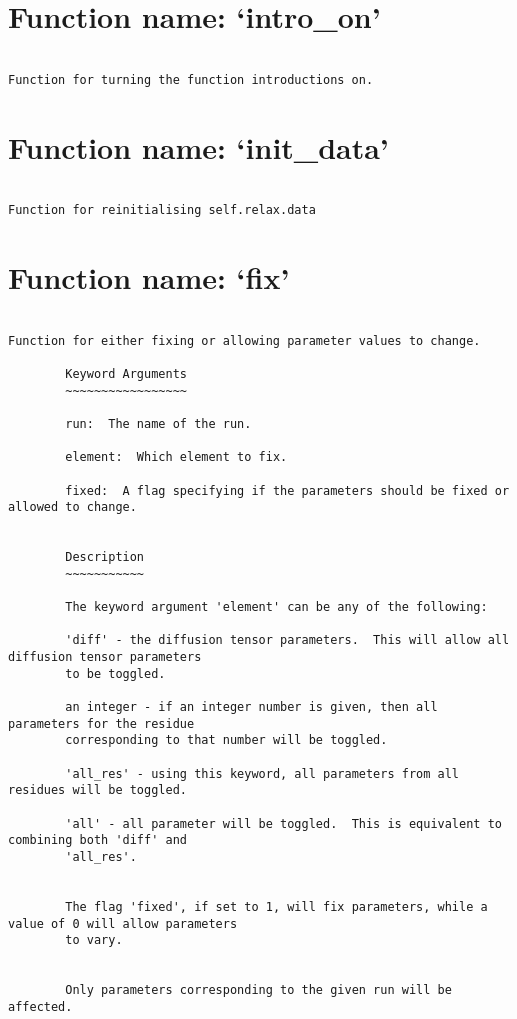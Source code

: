 \section{Function name: `intro\_on'}

\scriptsize
\begin{verbatim}

Function for turning the function introductions on.
\end{verbatim}

\normalsize
\section{Function name: `init\_data'}

\scriptsize
\begin{verbatim}

Function for reinitialising self.relax.data
\end{verbatim}

\normalsize
\section{Function name: `fix'}

\scriptsize
\begin{verbatim}

Function for either fixing or allowing parameter values to change.

        Keyword Arguments
        ~~~~~~~~~~~~~~~~~

        run:  The name of the run.

        element:  Which element to fix.

        fixed:  A flag specifying if the parameters should be fixed or allowed to change.


        Description
        ~~~~~~~~~~~

        The keyword argument 'element' can be any of the following:

        'diff' - the diffusion tensor parameters.  This will allow all diffusion tensor parameters
        to be toggled.

        an integer - if an integer number is given, then all parameters for the residue
        corresponding to that number will be toggled.

        'all_res' - using this keyword, all parameters from all residues will be toggled.

        'all' - all parameter will be toggled.  This is equivalent to combining both 'diff' and
        'all_res'.


        The flag 'fixed', if set to 1, will fix parameters, while a value of 0 will allow parameters
        to vary.


        Only parameters corresponding to the given run will be affected.
        
\end{verbatim}

